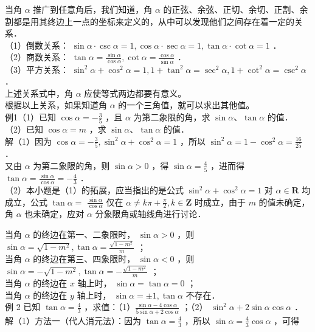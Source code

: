\documentclass[10pt]{article}
\begin{document}
当角 \(\alpha\) 推广到任意角后，我们知道，角 \(\alpha\) 的正弦、余弦、正切、余切、正割、余割都是用其终边上一点的坐标来定义的，从中可以发现他们之间存在着一定的关系．\\
（1）倒数关系： \(\sin \alpha \cdot \csc \alpha=1, \cos \alpha \cdot \sec \alpha=1, \tan \alpha \cdot \cot \alpha=1\) ．\\
（2）商数关系： \(\tan \alpha=\frac{\sin \alpha}{\cos \alpha}, \cot \alpha=\frac{\cos \alpha}{\sin \alpha}\) ．\\
（3）平方关系： \(\sin ^{2} \alpha+\cos ^{2} \alpha=1,1+\tan ^{2} \alpha=\sec ^{2} \alpha, 1+\cot ^{2} \alpha=\csc ^{2} \alpha\) ．\\
上述关系式中，角 \(\alpha\) 应使等式两边都要有意义。\\
根据以上关系，如果知道角 \(\alpha\) 的一个三角值，就可以求出其他值。\\
例1（1）已知 \(\cos \alpha=-\frac{3}{5}\) ，且 \(\alpha\) 为第二象限的角，求 \(\sin \alpha 、 \tan \alpha\) 的值．\\
（2）已知 \(\cos \alpha=m\) ，求 \(\sin \alpha 、 \tan \alpha\) 的值．\\
解（1）因为 \(\cos \alpha=-\frac{3}{5}, \sin ^{2} \alpha+\cos ^{2} \alpha=1\) ，所以 \(\sin ^{2} \alpha=1-\cos ^{2} \alpha=\frac{16}{25}\) ．\\
又由 \(\alpha\) 为第二象限的角，则 \(\sin \alpha>0\) ，得 \(\sin \alpha=\frac{4}{5}\) ，进而得 \(\tan \alpha=\frac{\sin \alpha}{\cos \alpha}=-\frac{4}{3}\) ．\\
（2）本小题是（1）的拓展，应当指出的是公式 \(\sin ^{2} \alpha+\cos ^{2} \alpha=1\) 对 \(\alpha \in \mathbf{R}\) 均成立，公式 \(\tan \alpha=\) \(\frac{\sin \alpha}{\cos \alpha}\) 仅在 \(\alpha \neq k \pi+\frac{\pi}{2}, k \in \mathbf{Z}\) 时成立，由于 \(m\) 的值未确定，角 \(\alpha\) 也未确定，应对 \(\alpha\) 分象限角或轴线角进行讨论．

当角 \(\alpha\) 的终边在第一、二象限时， \(\sin \alpha>0\) ，则 \(\sin \alpha=\sqrt{1-m^{2}}, \tan \alpha=\frac{\sqrt{1-m^{2}}}{m}\) ；\\
当角 \(\alpha\) 的终边在第三、四象限时， \(\sin \alpha<0\) ，则 \(\sin \alpha=-\sqrt{1-m^{2}}, \tan \alpha=-\frac{\sqrt{1-m^{2}}}{m}\) ；\\
当角 \(\alpha\) 的终边在 \(x\) 轴上时， \(\sin \alpha=\tan \alpha=0\) ；\\
当角 \(\alpha\) 的终边在 \(y\) 轴上时， \(\sin \alpha= \pm 1, \tan \alpha\) 不存在．\\
例 2 已知 \(\tan \alpha=\frac{4}{3}\) ，求值：（1）\(\frac{\sin \alpha-4 \cos \alpha}{5 \sin \alpha+2 \cos \alpha}\) ；（2） \(\sin ^{2} \alpha+2 \sin \alpha \cos \alpha\) ．\\
解（1）方法一（代人消元法）：因为 \(\tan \alpha=\frac{4}{3}\) ，所以 \(\sin \alpha=\frac{4}{3} \cos \alpha\) ，可得
\end{document}

